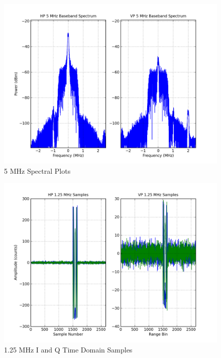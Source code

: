 \documentclass[12pt,english]{article}
\begin{document}
\begin{figure}[htb]
  \noindent \begin{centering}
  \includegraphics[width=4.75in]{IQSpectrumPT8_AH0_AV0M2.png}\medskip{}
  \caption{5 MHz Spectral Plots}
  \label{fig:IQSpectrumPT8_AH0_AV0M2}
  \par \end{centering}
\end{figure}

\begin{figure}[ht]
  \noindent \begin{centering}
  \includegraphics[width=4.75in]{1_25MHzTimeDomainPT8_AH0_AV0M2.png}\medskip{}
  \caption{1.25 MHz I and Q Time Domain Samples}
  \label{fig:1_25MHzTimeDomainPT8_AH0_AV0M2}
  \par \end{centering}
\end{figure}
\end{document}
